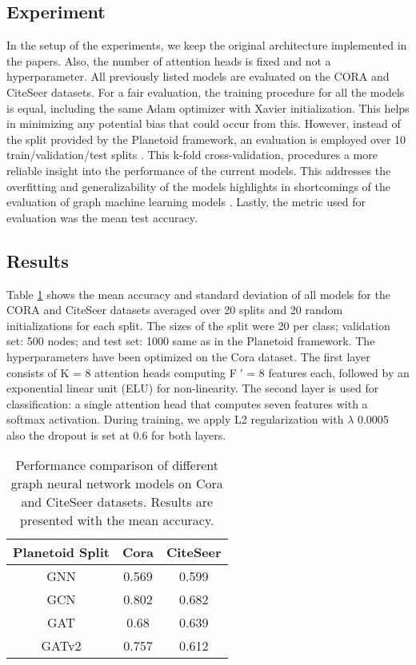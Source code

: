 \documentclass[runningheads]{llncs}
\begin{document}
\subsection{Experiment}
In the setup of the experiments, we keep the original architecture implemented in the papers. Also, the number of attention heads is fixed and not a hyperparameter. All previously listed models are evaluated on the CORA and CiteSeer datasets. For a fair evaluation, the training procedure for all the models is equal, including the same Adam optimizer with Xavier initialization. This helps in minimizing any potential bias that could occur from this. However, instead of the split provided by the Planetoid framework, an evaluation is employed over 10 train/validation/test splits \cite{lipton2018troubling}. This k-fold cross-validation, procedures a more reliable insight into the performance of the current models. This addresses the overfitting and generalizability of the models highlights in shortcomings of the evaluation of graph machine learning models \cite{Oleksandr}. Lastly, the metric used for evaluation was the mean test accuracy.
 
\subsection{Results}
Table \ref{table_1} shows the mean accuracy and standard deviation of all models for the CORA and CiteSeer datasets averaged over 20 splits and 20 random initializations for each split. The sizes of the split were 20 per class; validation set: 500 nodes; and test set: 1000 same as in the Planetoid framework.   The hyperparameters have been optimized on the Cora dataset. The first layer consists of K = 8 attention heads computing F ′ = 8 features each, followed by an exponential linear unit (ELU) for non-linearity. The second layer is used for classification: a single attention head that computes seven features with a softmax activation. During training, we apply L2 regularization with $\lambda$ 0.0005 also the dropout is set at 0.6 for both layers.

\begin{table}[h]
    \centering
    \begin{tabular}{||c c c ||} 
        \hline
        Planetoid Split & Cora & CiteSeer  \\ [0.5ex] 
        \hline\hline
        GNN & 0.569  & 0.599  \\ 
        \hline
        GCN & 0.802  & 0.682   \\
        \hline
        GAT & 0.68  & 0.639 \\
        \hline
        GATv2 & 0.757 & 0.612 \\
        \hline
    \end{tabular}
    \caption{Performance comparison of different graph neural network models on Cora and CiteSeer datasets. Results are presented with the mean accuracy.}
    \label{table_1}
\end{table}
\end{document}
